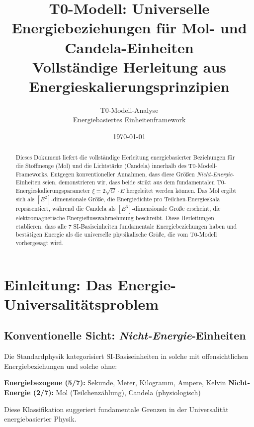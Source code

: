 \documentclass[12pt,a4paper]{article}
\newcommand{\xipar}{\xi}
\begin{document}
	
	\title{T0-Modell: Universelle Energiebeziehungen für Mol- und Candela-Einheiten\\
		\large Vollständige Herleitung aus Energieskalierungsprinzipien}
	\author{T0-Modell-Analyse\\
		Energiebasiertes Einheitenframework}
	\date{\today}
	
	\maketitle
	
	\begin{abstract}
		Dieses Dokument liefert die vollständige Herleitung energiebasierter Beziehungen für die Stoffmenge (Mol) und die Lichtstärke (Candela) innerhalb des T0-Modell-Frameworks. Entgegen konventioneller Annahmen, dass diese Größen \textit{Nicht-Energie}-Einheiten seien, demonstrieren wir, dass beide strikt aus dem fundamentalen T0-Energieskalierungsparameter $\xipar = 2\sqrt{G} \cdot E$ hergeleitet werden können. Das Mol ergibt sich als $[E^2]$-dimensionale Größe, die Energiedichte pro Teilchen-Energieskala repräsentiert, während die Candela als $[E^3]$-dimensionale Größe erscheint, die elektromagnetische Energieflusswahr\-nehmung beschreibt. Diese Herleitungen etablieren, dass alle 7 SI-Basiseinheiten fundamentale Energiebeziehungen haben und bestätigen Energie als die universelle physikalische Größe, die vom T0-Modell vorhergesagt wird.
	\end{abstract}
	
	\tableofcontents
	\newpage
	
	\section{Einleitung: Das Energie-Universalitätsproblem}
	\label{sec:einleitung}
	
	\subsection{Konventionelle Sicht: \textit{Nicht-Energie}-Einheiten}
	\label{subsec:konventionelle_sicht}
	
	Die Standardphysik kategorisiert SI-Basiseinheiten in solche mit offensichtlichen Energiebeziehungen und solche ohne:
	
	\textbf{Energiebezogene (5/7):} Sekunde, Meter, Kilogramm, Ampere, Kelvin
	\textbf{Nicht-Energie (2/7):} Mol (Teilchenzählung), Candela (physiologisch)
	
	Diese Klassifikation suggeriert fundamentale Grenzen in der Universalität energiebasierter Physik.
	
\end{document}
